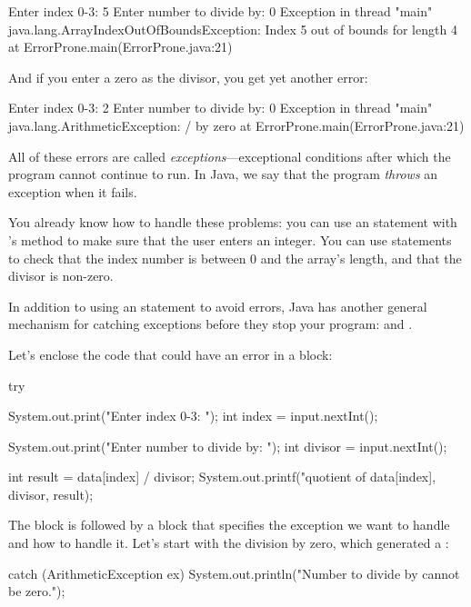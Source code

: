 \begin{stdout}
Enter index 0-3: 5
Enter number to divide by: 0
Exception in thread "main"
  java.lang.ArrayIndexOutOfBoundsException:
  Index 5 out of bounds for length 4
	at ErrorProne.main(ErrorProne.java:21)

\end{stdout}

And if you enter a zero as the divisor, you get yet another error:

\begin{stdout}
Enter index 0-3: 2
Enter number to divide by: 0
Exception in thread "main"
  java.lang.ArithmeticException: / by zero
    at ErrorProne.main(ErrorProne.java:21)
\end{stdout}

All of these errors are called {\em exceptions}---exceptional conditions after which the program cannot continue to run. In Java, we say that the program {\em throws} an exception when it fails.

You already know how to handle these problems: you can use an  statement with 's  method to make sure that the user enters an integer. You can use  statements to check that the index number is between 0 and the array's length, and that the divisor is non-zero.

In addition to using an  statement to avoid errors, Java has another general mechanism for catching exceptions before they stop your program:   and .

Let's enclose the code that could have an error in a  block:

\begin{code}
try {
    System.out.print("Enter index 0-3: ");
    int index = input.nextInt();
    
    System.out.print("Enter number to divide by: ");
    int divisor = input.nextInt();
    
    int result = data[index] / divisor;
    System.out.printf("quotient of %
        data[index], divisor, result);
}
\end{code}

The  block is followed by a  block that specifies the exception we want to handle
and how to handle it.  Let's start with the division by zero, which generated a :

\begin{code}
catch (ArithmeticException ex) {
    System.out.println("Number to divide by cannot be zero.");
}
\end{code}

